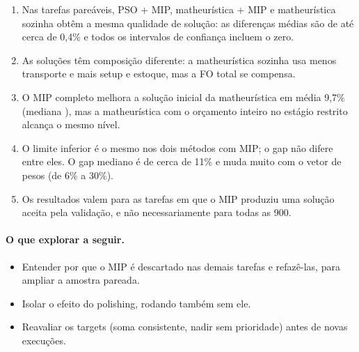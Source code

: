 \documentclass[11pt,a4paper]{article}
\begin{document}
\begin{enumerate}[leftmargin=*]
  \item Nas \nPaired{} tarefas pareáveis, PSO + MIP, matheurística + MIP e matheurística
  sozinha obtêm a mesma qualidade de solução: as diferenças médias são de até cerca de 0,4\% e
  todos os intervalos de confiança incluem o zero.
  \item As soluções têm composição diferente: a matheurística sozinha usa menos transporte
  e mais setup e estoque, mas a FO total se compensa.
  \item O MIP completo melhora a solução inicial da matheurística em média 9,7\% (mediana
  \gainMedian{}), mas a matheurística com o orçamento inteiro no estágio restrito alcança o mesmo
  nível.
  \item O limite inferior é o mesmo nos dois métodos com MIP; o gap não difere entre eles. O gap
  mediano é de cerca de 11\% e muda muito com o vetor de pesos (de 6\% a 30\%).
  \item Os resultados valem para as tarefas em que o MIP produziu uma solução aceita pela
  validação, e não necessariamente para todas as 900.
\end{enumerate}

\paragraph{O que explorar a seguir.}
\begin{itemize}[leftmargin=*]
  \item Entender por que o MIP é descartado nas demais tarefas e refazê-las, para ampliar a
  amostra pareada.
  \item Isolar o efeito do polishing, rodando também sem ele.
  \item Reavaliar os targets (soma consistente, nadir sem prioridade) antes de novas execuções.
\end{itemize}
\end{document}
